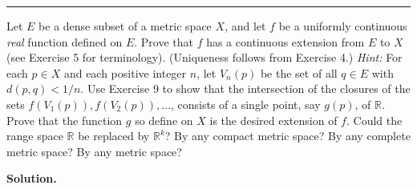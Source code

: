 \documentclass[12pt]{article}
\theoremstyle{definition}
\begin{document}
\bigskip\noindent\hrule\bigskip

Let $E$ be a dense subset of a metric space $X$, and let $f$ be a uniformly continuous \textit{real} function defined on $E$. Prove that $f$ has a continuous extension from $E$ to $X$ (see Exercise 5 for terminology). (Uniqueness follows from Exercise 4.) \textit{Hint:} For each $p\in X$ and each positive integer $n$, let $V_n(p)$ be the set of all $q\in E$ with $d(p,q)<1/n$. Use Exercise 9 to show that the intersection of the closures of the sets $f(V_1(p)),f(V_2(p)),\ldots$, consists of a single point, say $g(p)$, of $\mathbb{R}$. Prove that the function $g$ so define on $X$ is the desired extension of $f$.
Could the range space $\mathbb{R}$ be replaced by $\mathbb{R}^k$? By any compact metric space? By any complete metric space? By any metric space?

\smallskip
\noindent\textbf{Solution.}\quad
\end{document}
